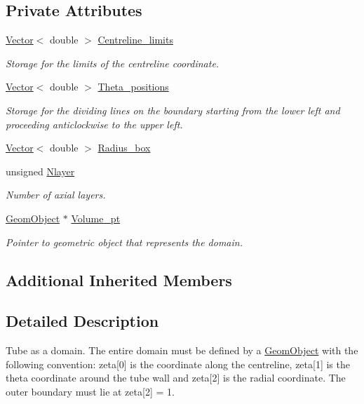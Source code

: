 \subsection*{Private Attributes}
\begin{DoxyCompactItemize}
\item 
\hyperlink{classoomph_1_1Vector}{Vector}$<$ double $>$ \hyperlink{classoomph_1_1TubeDomain_a472cea9a87841cc70a3b8a65e87f6aff}{Centreline\+\_\+limits}
\begin{DoxyCompactList}\small\item\em Storage for the limits of the centreline coordinate. \end{DoxyCompactList}\item 
\hyperlink{classoomph_1_1Vector}{Vector}$<$ double $>$ \hyperlink{classoomph_1_1TubeDomain_a893b7c0f20f3971948bf4ab04d3fe182}{Theta\+\_\+positions}
\begin{DoxyCompactList}\small\item\em Storage for the dividing lines on the boundary starting from the lower left and proceeding anticlockwise to the upper left. \end{DoxyCompactList}\item 
\hyperlink{classoomph_1_1Vector}{Vector}$<$ double $>$ \hyperlink{classoomph_1_1TubeDomain_ad70a97648fd496d9f5322e122ef907e4}{Radius\+\_\+box}
\item 
unsigned \hyperlink{classoomph_1_1TubeDomain_a76d77b0dde9979a92e88d3d0143bf114}{Nlayer}
\begin{DoxyCompactList}\small\item\em Number of axial layers. \end{DoxyCompactList}\item 
\hyperlink{classoomph_1_1GeomObject}{Geom\+Object} $\ast$ \hyperlink{classoomph_1_1TubeDomain_a6dd70d59e8cd65e44444f78fbfa1f97a}{Volume\+\_\+pt}
\begin{DoxyCompactList}\small\item\em Pointer to geometric object that represents the domain. \end{DoxyCompactList}\end{DoxyCompactItemize}
\subsection*{Additional Inherited Members}


\subsection{Detailed Description}
Tube as a domain. The entire domain must be defined by a \hyperlink{classoomph_1_1GeomObject}{Geom\+Object} with the following convention\+: zeta\mbox{[}0\mbox{]} is the coordinate along the centreline, zeta\mbox{[}1\mbox{]} is the theta coordinate around the tube wall and zeta\mbox{[}2\mbox{]} is the radial coordinate. The outer boundary must lie at zeta\mbox{[}2\mbox{]} = 1. 


